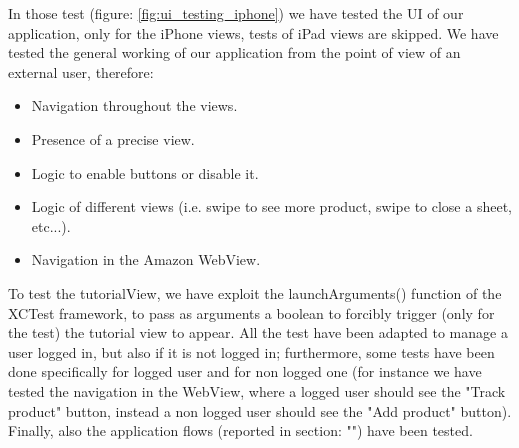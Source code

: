 \FloatBarrier
In those test (figure: \ref{fig:ui_testing_iphone}) we have tested the UI of our application, only for the iPhone views, tests of iPad views are skipped.
We have tested the general working of our application from the point of view of an external user, therefore:
\begin{itemize}
    \item Navigation throughout the views.
    \item Presence of a precise view.
    \item Logic to enable buttons or disable it.
    \item Logic of different views (i.e. swipe to see more product, swipe to close a sheet, etc...).
    \item Navigation in the Amazon WebView.
\end{itemize}
To test the tutorialView, we have exploit the launchArguments() function of the XCTest framework, to pass as arguments a boolean to forcibly trigger (only for the test) the tutorial view to appear.
All the test have been adapted to manage a user logged in, but also if it is not logged in; furthermore, some tests have been done specifically for logged user and for non logged one (for instance we have tested the navigation in the WebView, where a logged user should see the "Track product" button, instead a non logged user should see the "Add product" button).
Finally, also the application flows (reported in section: "") have been tested.

\newpage
